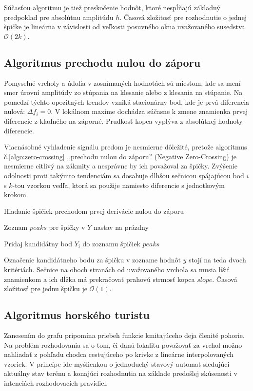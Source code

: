Súčasťou algoritmu je tiež preskočenie hodnôt, ktoré nespĺňajú základný predpoklad pre absolútnu amplitúdu $h$.
Časová zložitosť pre rozhodnutie o jednej špičke je lineárna v závislosti od veľkosti posuvného okna uvažovaného
susedstva $\mathcal{O}(2k)$.

\subsection{Algoritmus prechodu nulou do záporu}
Pomyselné vrcholy a údolia v zosnímaných hodnotách sú miestom, kde sa mení smer úrovní amplitúdy zo stúpania na klesanie alebo
z klesania na stúpanie. Na pomedzí týchto opozitných trendov vzniká stacionárny bod, kde je prvá diferencia nulová:
$\Delta f_i = 0$. V lokálnom maxime dochádza súčasne k zmene znamienka prvej diferencie z kladného na záporné. Prudkosť
kopca vyplýva z absolútnej hodnoty diferencie.

Viacnásobné vyhladenie signálu predom je nesmierne dôležité,
pretože algoritmus č.\ref{algo:zero-crossing} ,,prechodu nulou do záporu'' (Negative Zero-Crossing) je nesmierne citlivý
na zákmity a nesprávne by ich považoval za špičky. Zvýšenie odolnosti proti takýmto tendenciám sa dosahuje dlhšou sečnicou
spájajúcou bod $i$ s $k$-tou vzorkou vedľa, ktorá sa použije namiesto diferencie s jednotkovým krokom.

\begin{algorithm}[h]
\caption{Hľadanie špičiek prechodom prvej derivácie nulou do záporu}
\begin{algorithmic}[1]
\State Zoznam $peaks$ pre špičky v $Y$ nastav na prázdny

	    	\State Pridaj kandidátny bod $Y_i$ do zoznamu špičiek $peaks$
		\EndIf
	\EndIf
\EndFor
\end{algorithmic}
\label{algo:zero-crossing}
\end{algorithm}

Označenie kandidátneho bodu za špičku v zozname hodnôt $y$ stojí na teda dvoch kritériách. Sečnice na oboch stranách od uvažovaného 
vrchola sa musia líšiť znamienkom a ich dĺžka má prekračovať prahovú strmosť kopca $slope$. Časová zložitosť pre jednu špičku je 
$\mathcal{O}(1)$.

\subsection{Algoritmus horského turistu}
Zanesením do grafu pripomína priebeh funkcie kmitajúceho deja členité pohorie. Na problém rozhodovania sa o tom, či danú lokalitu
považovať za vrchol možno nahliadať z pohľadu chodca cestujúceho po krivke z lineárne interpolovaných vzoriek. V princípe
ide myšlienkou o jednoduchý stavový automat sledujúci aktuálny stav terénu a konajúci rozhodnutia na základe predošlej
skúsenosti v intenciách rozhodovacích pravidiel.


